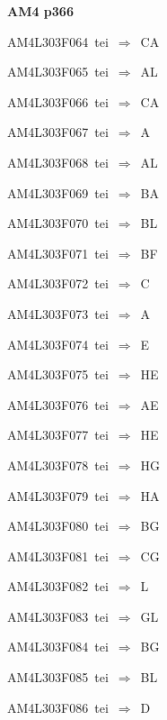 \par\vfill\eject
{\bf\hfill AM4 p366\hfill\hbox{}}\par\bigskip
{\sixrm AM4L303F064\ {\sixit tei}\ }$\Rightarrow$\ CA\par\smallskip
{\sixrm AM4L303F065\ {\sixit tei}\ }$\Rightarrow$\ AL\par\smallskip
{\sixrm AM4L303F066\ {\sixit tei}\ }$\Rightarrow$\ CA\par\smallskip
{\sixrm AM4L303F067\ {\sixit tei}\ }$\Rightarrow$\ A\par\smallskip
{\sixrm AM4L303F068\ {\sixit tei}\ }$\Rightarrow$\ AL\par\smallskip
{\sixrm AM4L303F069\ {\sixit tei}\ }$\Rightarrow$\ BA\par\smallskip
{\sixrm AM4L303F070\ {\sixit tei}\ }$\Rightarrow$\ BL\par\smallskip
{\sixrm AM4L303F071\ {\sixit tei}\ }$\Rightarrow$\ BF\par\smallskip
{\sixrm AM4L303F072\ {\sixit tei}\ }$\Rightarrow$\ C\par\smallskip
{\sixrm AM4L303F073\ {\sixit tei}\ }$\Rightarrow$\ A\par\smallskip
{\sixrm AM4L303F074\ {\sixit tei}\ }$\Rightarrow$\ E\par\smallskip
{\sixrm AM4L303F075\ {\sixit tei}\ }$\Rightarrow$\ HE\par\smallskip
{\sixrm AM4L303F076\ {\sixit tei}\ }$\Rightarrow$\ AE\par\smallskip
{\sixrm AM4L303F077\ {\sixit tei}\ }$\Rightarrow$\ HE\par\smallskip
{\sixrm AM4L303F078\ {\sixit tei}\ }$\Rightarrow$\ HG\par\smallskip
{\sixrm AM4L303F079\ {\sixit tei}\ }$\Rightarrow$\ HA\par\smallskip
{\sixrm AM4L303F080\ {\sixit tei}\ }$\Rightarrow$\ BG\par\smallskip
{\sixrm AM4L303F081\ {\sixit tei}\ }$\Rightarrow$\ CG\par\smallskip
{\sixrm AM4L303F082\ {\sixit tei}\ }$\Rightarrow$\ L\par\smallskip
{\sixrm AM4L303F083\ {\sixit tei}\ }$\Rightarrow$\ GL\par\smallskip
{\sixrm AM4L303F084\ {\sixit tei}\ }$\Rightarrow$\ BG\par\smallskip
{\sixrm AM4L303F085\ {\sixit tei}\ }$\Rightarrow$\ BL\par\smallskip
{\sixrm AM4L303F086\ {\sixit tei}\ }$\Rightarrow$\ D\par\smallskip


